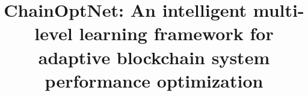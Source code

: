 \documentclass[a4paper,fleqn]{cas-dc}
\begin{document}







	
	\title[mode = title]{ChainOptNet: An intelligent multi-level learning framework for adaptive blockchain system performance optimization}
	
	
	
	
	
	
	
	
\end{document}
